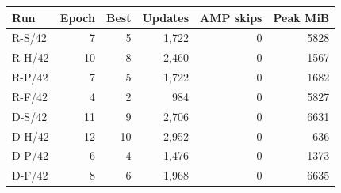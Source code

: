 \begin{tabular}{lrrrrr}
\toprule
Run & Epoch & Best & Updates & AMP skips & Peak MiB\\
\midrule
R-S/42 & 7 & 5 & 1,722 & 0 & 5828\\
R-H/42 & 10 & 8 & 2,460 & 0 & 1567\\
R-P/42 & 7 & 5 & 1,722 & 0 & 1682\\
R-F/42 & 4 & 2 & 984 & 0 & 5827\\
D-S/42 & 11 & 9 & 2,706 & 0 & 6631\\
D-H/42 & 12 & 10 & 2,952 & 0 & 636\\
D-P/42 & 6 & 4 & 1,476 & 0 & 1373\\
D-F/42 & 8 & 6 & 1,968 & 0 & 6635\\
\bottomrule
\end{tabular}

